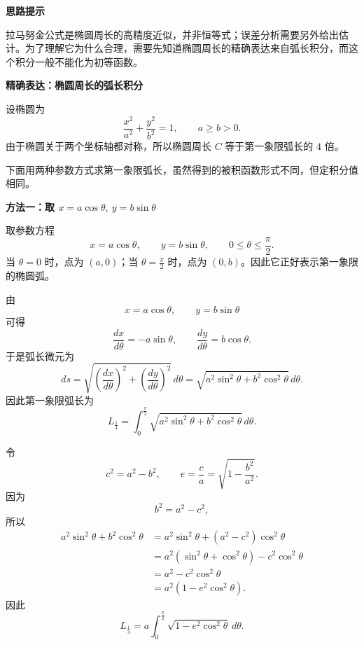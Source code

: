 \begin{proofbox}
	\textbf{\textcolor{CProof}{思路提示}}

	拉马努金公式是椭圆周长的高精度近似，并非恒等式；误差分析需要另外给出估计。为了理解它为什么合理，需要先知道椭圆周长的精确表达来自弧长积分，而这个积分一般不能化为初等函数。

	\medskip
	\begin{center}
		
	\end{center}

	\medskip
	\textbf{\textcolor{CProof}{精确表达：椭圆周长的弧长积分}}

	设椭圆为
	\[
		\frac{x^2}{a^2}+\frac{y^2}{b^2}=1,
		\qquad a\ge b>0.
	\]
	由于椭圆关于两个坐标轴都对称，所以椭圆周长 \(C\) 等于第一象限弧长的 \(4\) 倍。

	下面用两种参数方式求第一象限弧长，虽然得到的被积函数形式不同，但定积分值相同。

	\medskip
	\textbf{\textcolor{CProof}{方法一：取 \(x=a\cos\theta,\ y=b\sin\theta\)}}

	取参数方程
	\[
		x=a\cos\theta,\qquad y=b\sin\theta,
		\qquad 0\le \theta\le \frac{\pi}{2}.
	\]
	当 \(\theta=0\) 时，点为 \((a,0)\)；当 \(\theta=\frac{\pi}{2}\) 时，点为 \((0,b)\)。因此它正好表示第一象限的椭圆弧。

	由
	\[
		x=a\cos\theta,\qquad y=b\sin\theta
	\]
	可得
	\[
		\frac{dx}{d\theta}=-a\sin\theta,
		\qquad
		\frac{dy}{d\theta}=b\cos\theta.
	\]
	于是弧长微元为
	\[
		ds
		=
		\sqrt{
			\left(\frac{dx}{d\theta}\right)^2
			+
			\left(\frac{dy}{d\theta}\right)^2
		}
		\,d\theta
		=
		\sqrt{
			a^2\sin^2\theta+b^2\cos^2\theta
		}
		\,d\theta.
	\]
	因此第一象限弧长为
	\[
		L_{\frac14}
		=
		\int_0^{\frac{\pi}{2}}
		\sqrt{
			a^2\sin^2\theta+b^2\cos^2\theta
		}
		\,d\theta.
	\]

	令
	\[
		c^2=a^2-b^2,
		\qquad
		e=\frac{c}{a}
		=
		\sqrt{1-\frac{b^2}{a^2}}.
	\]
	因为
	\[
		b^2=a^2-c^2,
	\]
	所以
	\[
		\begin{aligned}
			a^2\sin^2\theta+b^2\cos^2\theta
			 & =
			a^2\sin^2\theta+(a^2-c^2)\cos^2\theta          \\[0.4em]
			 & =
			a^2(\sin^2\theta+\cos^2\theta)-c^2\cos^2\theta \\[0.4em]
			 & =
			a^2-c^2\cos^2\theta                            \\[0.4em]
			 & =
			a^2\left(1-e^2\cos^2\theta\right).
		\end{aligned}
	\]
	因此
	\[
		L_{\frac14}
		=
		a\int_0^{\frac{\pi}{2}}
		\sqrt{1-e^2\cos^2\theta}
		\,d\theta.
	\]


\end{proofbox}
